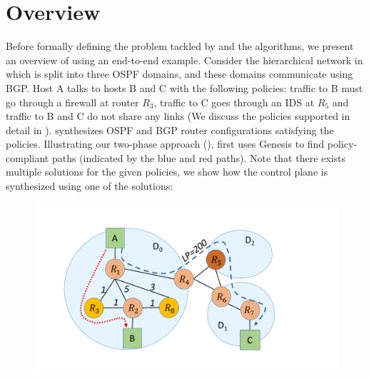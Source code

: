 \section{Overview}
Before formally defining the problem tackled by \name and the algorithms, 
we present an overview of \name using an end-to-end
example. Consider the hierarchical network in  which
is split into three OSPF domains, and these domains communicate
using BGP. Host A talks to hosts B and C with the following policies:
traffic to B must go through a firewall at router $R_3$, traffic to C 
goes through an IDS at $R_5$ and traffic 
to B and C do not share any links (We discuss the policies supported in
detail in ). \name 
synthesizes OSPF and BGP router configurations satisfying the 
policies. Illustrating our two-phase approach (), 
\name first uses Genesis to find policy-compliant paths (indicated by the blue and
red paths). Note that there exists multiple solutions for the given
policies, we show how the control plane is synthesized using one of the solutions:
\begin{figure}
	\includegraphics[width=0.75\columnwidth]{figures/example.pdf}
	\label{fig:example}
\end{figure}

